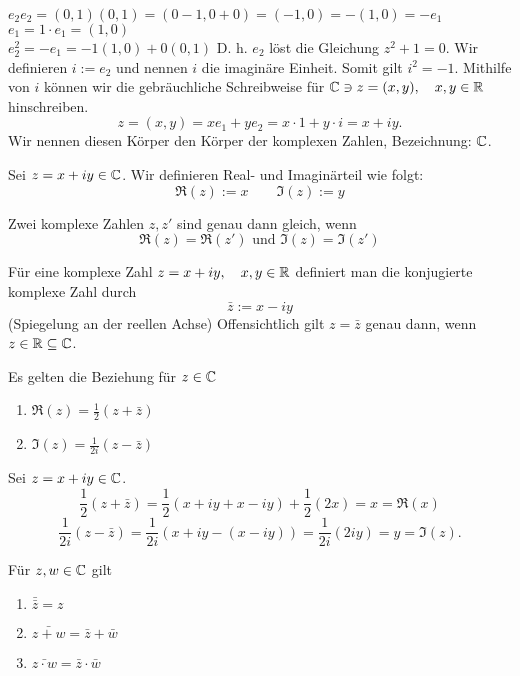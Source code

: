 \documentclass[../ana1.tex]{subfiles}
\begin{document}
\( e_2 e_2 = (0,1)(0,1) = (0-1,0 + 0) = (-1,0) = -(1,0) = -e_1 \)\\
\(e_1 = 1\cdot e_1 = (1,0) \)\\
\( e_2^2 = -e_1 = -1 (1,0) + 0(0,1) \)
D. h. \(e_2\) löst die Gleichung \( z^2+1=0 \). Wir definieren \(i:= e_2\) und nennen \(i\) die imaginäre Einheit. Somit gilt \( i^2 = -1 \). Mithilfe von \(i\) können wir die gebräuchliche Schreibweise für \( \mathbb{C}\ni z = (x,y), \quad x,y\in\mathbb{R} \) hinschreiben.
\[ z = (x,y) = x e_1 + y e_2 = x \cdot 1 + y \cdot i = x + i y. \]
Wir nennen diesen Körper den Körper der komplexen Zahlen, Bezeichnung: \( \mathbb{C} \).
\begin{defi}
	Sei \( z=x+iy\in\mathbb{C} \). Wir definieren Real- und Imaginärteil wie folgt:
	\[ \Re(z) := x \qquad \Im(z):=y \]
\end{defi}
\begin{bem}
	Zwei komplexe Zahlen \( z,z' \) sind genau dann gleich, wenn
	\[ \Re(z)=\Re(z') \text{ und } \Im(z) = \Im(z') \]
\end{bem}
\begin{defi}
	Für eine komplexe Zahl \( z=x+iy, \quad x,y\in\mathbb{R} \) definiert man die konjugierte komplexe Zahl durch
	\[ \bar{z} := x - iy \]
	(Spiegelung an der reellen Achse)
	Offensichtlich gilt \( z=\bar{z} \) genau dann, wenn \( z\in\mathbb{R}\subseteq \mathbb{C} \).
\end{defi}
\begin{lem}
	Es gelten die Beziehung für \( z\in\mathbb{C} \)
	\begin{enumerate}
		\item \(\Re(z) = \frac{1}{2} (z+\bar{z}) \)
		\item \(\Im(z) = \frac{1}{2i} (z-\bar{z}) \)
	\end{enumerate}
\end{lem}
\begin{bew}
	Sei \( z=x+iy\in\mathbb{C} \).
	\[ \frac{1}{2}(z+\bar{z}) = \frac{1}{2}(x+iy + x-iy) + \frac{1}{2}(2x) = x = \Re(x) \]
	\[ \frac{1}{2i}(z-\bar{z}) = \frac{1}{2i}(x+iy - (x-iy)) = \frac{1}{2i}(2iy) = y = \Im(z). \]
\end{bew}
\begin{lem}
	Für \( z,w\in\mathbb{C} \) gilt
	\begin{enumerate}
		\item \( \bar{\bar{z}} = z \)
		\item \( \bar{z+w} = \bar{z} + \bar{w} \)
		\item \( \bar{z\cdot w} = \bar{z} \cdot \bar{w} \)
	\end{enumerate}
\end{lem}
\end{document}

